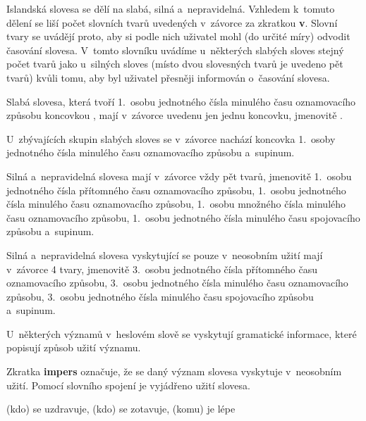 Islandská slovesa se dělí na slabá, silná a~nepravidelná. Vzhledem k~tomuto dělení se liší počet slovních tvarů uvedených v~závorce za zkratkou \textbf{v}. Slovní tvary se uvádějí proto, aby si podle nich uživatel mohl
(do určité míry) odvodit časování slovesa. V~tomto slovníku 
uvádíme u~některých slabých sloves stejný počet tvarů jako u~silných sloves (místo dvou slovesných tvarů je uvedeno pět tvarů) kvůli tomu, aby byl uživatel přesněji informován o~časování slovesa.

Slabá slovesa, která tvoří 1.~osobu jednotného čísla minulého času oznamovacího způsobu koncovkou , mají v~závorce uvedenu jen jednu koncovku, jmenovitě .

\blspace
  \dicEntry {}  
\blspace

U~zbývajících skupin slabých sloves se v~závorce nachází koncovka 1.~osoby jednotného čísla minulého času oznamovacího způsobu a~supinum.

\blspace
  \dicEntry {}  
\blspace

Silná a~nepravidelná slovesa mají v~závorce vždy pět tvarů, jmenovitě 1.~osobu jednotného čísla přítomného času oznamovacího způsobu, 1.~osobu jednotného čísla minulého času oznamovacího způsobu, 1.~osobu množného čísla minulého času oznamovacího způsobu, 1.~osobu jednotného čísla minulého času spojovacího způsobu a~supinum.

\blspace
  \dicEntry {}  
\blspace

Silná a~nepravidelná slovesa vyskytující se pouze v~neosobním užití mají v~závorce 4 tvary, jmenovitě 3.~osobu jednotného čísla přítomného času oznamovacího způsobu, 3.~osobu jednotného čísla minulého času oznamovacího způsobu, 3.~osobu jednotného čísla minulého času spojovacího způsobu a~supinum.

\blspace
  \dicEntry {}  
\blspace

U~některých významů v~heslovém slově se vyskytují gramatické informace, které popisují způsob užití významu.

Zkratka \textbf{impers} označuje, že se daný význam slovesa vyskytuje v~neosobním užití. Pomocí slovního spojení je vyjádřeno užití slovesa.

\blspace
  \dicEntry {}     (kdo) se uzdravuje, (kdo) se zotavuje, (komu) je lépe
\blspace

